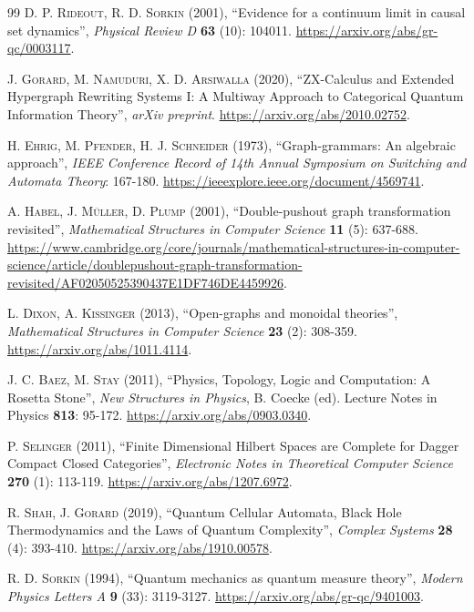 \documentclass{article}
\begin{document}
\begin{thebibliography}{99}
\textsc{D. P. Rideout, R. D. Sorkin} (2001), ``Evidence for a continuum limit in causal set dynamics'', \textit{Physical Review D} \textbf{63} (10): 104011. \url{https://arxiv.org/abs/gr-qc/0003117}.

\textsc{J. Gorard, M. Namuduri, X. D. Arsiwalla} (2020), ``ZX-Calculus and Extended Hypergraph Rewriting Systems I: A Multiway Approach to Categorical Quantum Information Theory'', \textit{arXiv preprint}. \url{https://arxiv.org/abs/2010.02752}.

\textsc{H. Ehrig, M. Pfender, H. J. Schneider} (1973), ``Graph-grammars: An algebraic approach'', \textit{IEEE Conference Record of 14th Annual Symposium on Switching and Automata Theory}: 167-180. \url{https://ieeexplore.ieee.org/document/4569741}.

\textsc{A. Habel, J. M\"uller, D. Plump} (2001), ``Double-pushout graph transformation revisited'', \textit{Mathematical Structures in Computer Science} \textbf{11} (5): 637-688. \url{https://www.cambridge.org/core/journals/mathematical-structures-in-computer-science/article/doublepushout-graph-transformation-revisited/AF02050525390437E1DF746DE4459926}.

\textsc{L. Dixon, A. Kissinger} (2013), ``Open-graphs and monoidal theories'', \textit{Mathematical Structures in Computer Science} \textbf{23} (2): 308-359. \url{https://arxiv.org/abs/1011.4114}.

\textsc{J. C. Baez, M. Stay} (2011), ``Physics, Topology, Logic and Computation: A Rosetta Stone'', \textit{New Structures in Physics}, B. Coecke (ed). Lecture Notes in Physics \textbf{813}: 95-172. \url{https://arxiv.org/abs/0903.0340}.

\textsc{P. Selinger} (2011), ``Finite Dimensional Hilbert Spaces are Complete for Dagger Compact Closed Categories'', \textit{Electronic Notes in Theoretical Computer Science} \textbf{270} (1): 113-119. \url{https://arxiv.org/abs/1207.6972}.

\textsc{R. Shah, J. Gorard} (2019), ``Quantum Cellular Automata, Black Hole Thermodynamics and the Laws of Quantum Complexity'', \textit{Complex Systems} \textbf{28} (4): 393-410. \url{https://arxiv.org/abs/1910.00578}.

\textsc{R. D. Sorkin} (1994), ``Quantum mechanics as quantum measure theory'', \textit{Modern Physics Letters A} \textbf{9} (33): 3119-3127. \url{https://arxiv.org/abs/gr-qc/9401003}.


\end{thebibliography}
\end{document}
